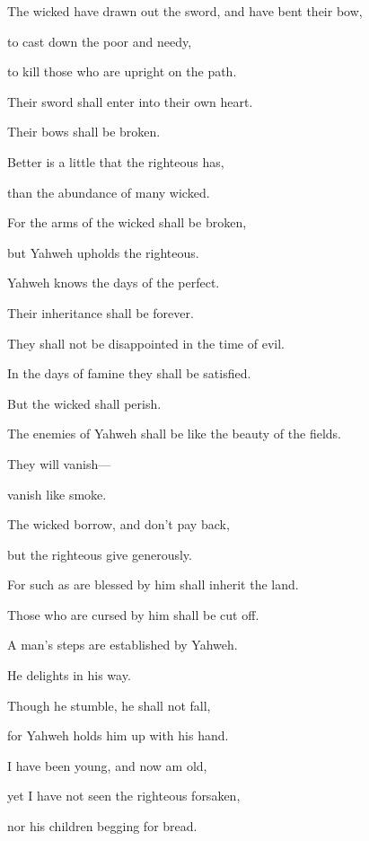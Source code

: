 {\par }{\Q {}The wicked have drawn out the sword, and have bent their bow,
\par }{\QB to cast down the poor and needy,
\par }{\QB to kill those who are upright on the path.
\par }{\Q {}Their sword shall enter into their own heart.
\par }{\QB Their bows shall be broken.
\par }{\Q {}Better is a little that the righteous has,
\par }{\QB than the abundance of many wicked.
\par }{\Q {}For the arms of the wicked shall be broken,
\par }{\QB but Yahweh upholds the righteous.
\par }{\Q {}Yahweh knows the days of the perfect.
\par }{\QB Their inheritance shall be forever.
\par }{\Q {}They shall not be disappointed in the time of evil.
\par }{\QB In the days of famine they shall be satisfied.
\par }{\BB \par }{\Q {}But the wicked shall perish.
\par }{\QB The enemies of Yahweh shall be like the beauty of the fields.
\par }{\QB They will vanish—
\par }{\QB vanish like smoke.
\par }{\Q {}The wicked borrow, and don’t pay back,
\par }{\QB but the righteous give generously.
\par }{\Q {}For such as are blessed by him shall inherit the land.
\par }{\QB Those who are cursed by him shall be cut off.
\par }{\Q {}A man’s steps are established by Yahweh.
\par }{\QB He delights in his way.
\par }{\Q {}Though he stumble, he shall not fall,
\par }{\QB for Yahweh holds him up with his hand.
\par }{\Q {}I have been young, and now am old,
\par }{\QB yet I have not seen the righteous forsaken,
\par }{\QB nor his children begging for bread.
}
